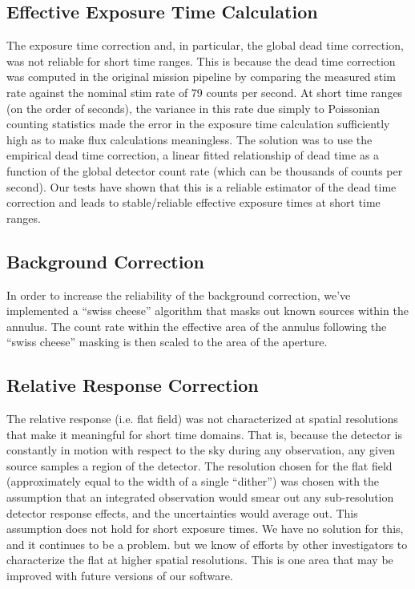 \documentclass[preprint]{aastex}
\begin{document}
\subsection{Effective Exposure Time Calculation}
The exposure time correction and, in particular, the global dead time correction, was not reliable for short time ranges. This is because the dead time correction was computed in the original mission pipeline by comparing the measured stim rate against the nominal stim rate of 79 counts per second. At short time ranges (on the order of seconds), the variance in this rate due simply to Poissonian counting statistics made the error in the exposure time calculation sufficiently high as to make flux calculations meaningless. The solution was to use the empirical dead time correction, a linear fitted relationship of dead time as a function of the global detector count rate (which can be thousands of counts per second). Our tests have shown that this is a reliable estimator of the dead time correction and leads to stable/reliable effective exposure times at short time ranges.

\subsection{Background Correction}
In order to increase the reliability of the background correction, we’ve implemented a ``swiss cheese'' algorithm that masks out known sources within the annulus.  The count rate within the effective area of the annulus following the ``swiss cheese'' masking is then scaled to the area of the aperture.

\subsection{Relative Response Correction}
The relative response (i.e. flat field) was not characterized at spatial resolutions that make it meaningful for short time domains. That is, because the detector is constantly in motion with respect to the sky during any observation, any given source samples a region of the detector. The resolution chosen for the flat field (approximately equal to the width of a single ``dither'') was chosen with the assumption that an integrated observation would smear out any sub-resolution detector response effects, and the uncertainties would average out. This assumption does not hold for short exposure times. We have no solution for this, and it continues to be a problem. but we know of efforts by other investigators to characterize the flat at higher spatial resolutions.  This is one area that may be improved with future versions of our software.
\end{document}
